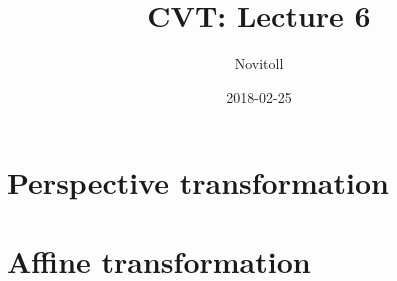 \documentclass[11pt]{article}
\title{CVT: Lecture 6}
\date{2018-02-25}
\author{Novitoll}
\begin{document}
    \section{Perspective transformation} \label{sec:perspective transformation}


    \section{Affine transformation} \label{sec:affine transformation}
\end{document}
